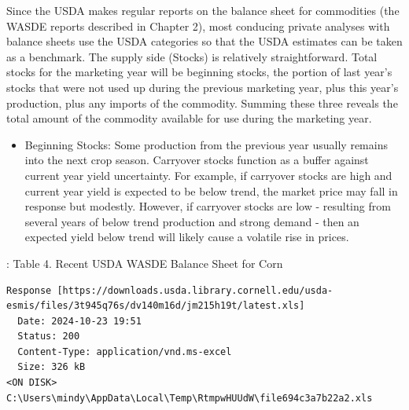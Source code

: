 \documentclass[
  letterpaper,
  DIV=11,
  numbers=noendperiod]{scrreprt}
\providecommand{\tightlist}{%
  \setlength{\itemsep}{0pt}\setlength{\parskip}{0pt}}\usepackage{longtable,booktabs,array}
\begin{document}
Since the USDA makes regular reports on the balance sheet for
commodities (the WASDE reports described in Chapter 2), most conducing
private analyses with balance sheets use the USDA categories so that the
USDA estimates can be taken as a benchmark. The supply side (Stocks) is
relatively straightforward. Total stocks for the marketing year will be
beginning stocks, the portion of last year's stocks that were not used
up during the previous marketing year, plus this year's production, plus
any imports of the commodity. Summing these three reveals the total
amount of the commodity available for use during the marketing year.

\begin{itemize}
\tightlist
\item
  Beginning Stocks: Some production from the previous year usually
  remains into the next crop season. Carryover stocks function as a
  buffer against current year yield uncertainty. For example, if
  carryover stocks are high and current year yield is expected to be
  below trend, the market price may fall in response but modestly.
  However, if carryover stocks are low - resulting from several years of
  below trend production and strong demand - then an expected yield
  below trend will likely cause a volatile rise in prices.
\end{itemize}

: Table 4. Recent USDA WASDE Balance Sheet for Corn

\begin{verbatim}
Response [https://downloads.usda.library.cornell.edu/usda-esmis/files/3t945q76s/dv140m16d/jm215h19t/latest.xls]
  Date: 2024-10-23 19:51
  Status: 200
  Content-Type: application/vnd.ms-excel
  Size: 326 kB
<ON DISK>  C:\Users\mindy\AppData\Local\Temp\RtmpwHUUdW\file694c3a7b22a2.xls
\end{verbatim}
\end{document}
